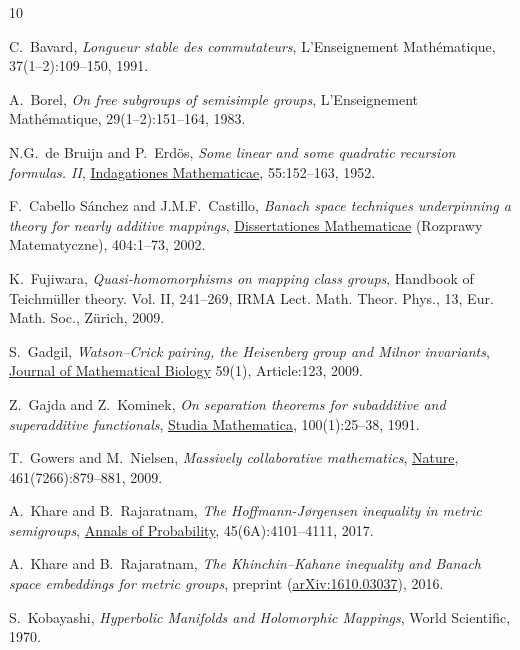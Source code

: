 \documentclass[11pt,a4paper,reqno]{amsart}
\numberwithin{equation}{section}
\theoremstyle{plain}
\theoremstyle{definition}
\begin{document}
\begin{thebibliography}{10}

C.~Bavard, {\em Longueur stable des commutateurs}, L'Enseignement
  Math\'ematique, 37(1--2):109--150, 1991.

A.~Borel, \emph{On free subgroups of semisimple groups}, L'Enseignement
  Math\'ematique, 29(1--2):151--164, 1983.

N.G.~de Bruijn and P.~Erd\"os, {\em Some linear and some quadratic
  recursion formulas. II},
  \href{http://dx.doi.org/10.1016/S1385-7258(52)50021-0}{Indagationes
  Mathematicae}, 55:152--163, 1952.

F.~Cabello S\'anchez and J.M.F.~Castillo, {\em Banach space techniques
  underpinning a theory for nearly additive mappings},
  \href{https://www.impan.pl/en/publishing-house/journals-and-series/dissertationes-mathematicae/all/404}{Dissertationes
  Mathematicae} (Rozprawy Matematyczne), 404:1--73, 2002.

K.~Fujiwara, {\em Quasi-homomorphisms on mapping class groups},
  Handbook of Teichm\"uller theory. Vol. II, 241--269, IRMA Lect. Math.
  Theor. Phys., 13, Eur. Math. Soc., Z\"urich, 2009.

S.~Gadgil, {\em Watson--Crick pairing, the Heisenberg group and Milnor
  invariants}, \href{http://dx.doi.org/10.1007/s00285-008-0223-x}{Journal
  of Mathematical Biology} 59(1), Article:123, 2009.

Z.~Gajda and Z.~Kominek, {\em On separation theorems for subadditive and
  superadditive functionals},
  \href{http://pldml.icm.edu.pl/pldml/element/bwmeta1.element.bwnjournal-article-smv100i1p25bwm}{Studia
  Mathematica}, 100(1):25--38, 1991.

T.~Gowers and M.~Nielsen, {\em Massively collaborative mathematics},
  \href{https://www.nature.com/articles/461879a}{Nature},
  461(7266):879--881, 2009.

A.~Khare and B.~Rajaratnam, {\em The Hoffmann-J{\o}rgensen inequality in
  metric semigroups}, \href{http://dx.doi.org/10.1214/16-AOP1160}{Annals
  of Probability}, 45(6A):4101--4111, 2017.

A.~Khare and B.~Rajaratnam, {\em The Khinchin--Kahane inequality and
  Banach space embeddings for metric groups}, preprint
  (\href{http://arxiv.org/abs/1610.03037}{arXiv:1610.03037}), 2016.

S.~Kobayashi, {\em Hyperbolic Manifolds and Holomorphic Mappings},
World Scientific, 1970.


\end{thebibliography}
\end{document}
